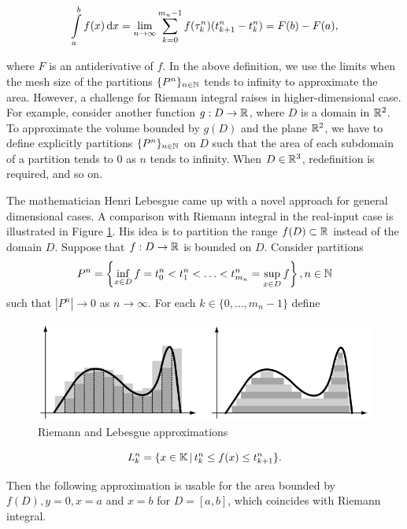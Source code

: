 \begin{equation}
  \label{equation:definition:riemann-integral}
  \int\limits_a^b f(x)\,\mathrm{d}  x = \lim\limits_{n\to\infty}\sum\limits_{k=0}^{m_n-1}f(\tau_k^n)(t_{k+1}^n-t_k^n) = F(b)-F(a),
\end{equation}

where $F$ is an antiderivative of $f$. In the above definition, we use the limits when the mesh size of the partitions $\{P^n\}_{n\in\mathbb{N}}$ tends to infinity to approximate the area. However, a challenge for Riemann integral raises in higher-dimensional case. For example, consider another function $g: D\to\mathbb{R}$, where $D$ is a domain in $\mathbb{R}^2$. To approximate the volume bounded by $g(D)$ and the plane $\mathbb{R}^2$, we have to define explicitly partitions $\{P^n\}_{n\in\mathbb{N}}$ on $D$ such that the area of each subdomain of a partition tends to $0$ as $n$ tends to infinity. When $D\in\mathbb{R}^3$, redefinition is required, and so on.

The mathematician Henri Lebesgue came up with a novel approach for general dimensional cases. A comparison with Riemann integral in the real-input case is illustrated in Figure \ref{figure:schilling}. His idea is to partition the range $f(D)\subset\mathbb{R}$ instead of the domain $D$. Suppose that $f:D\to\mathbb{R}$ is bounded on $D$. Consider partitions $$P^n=\left\{\inf\limits_{x\in D} f=t^n_0<t^n_1<\ldots<t^n_{m_n}=\sup\limits_{x\in D} f\right\}, n\in\mathbb{N}$$ such that $|P^n|\to 0$ as $n\to\infty$. For each $k\in\{0,\ldots,m_n-1\}$ define

\begin{figure}
  \centering
  \includegraphics[width=0.75\linewidth]{img/riemann-vs-lebesgue.png}
  \vspace{0.5cm}
  \caption[Riemann and Lebesgue approximations]{Riemann and Lebesgue approximations \cite{schilling2017measures}}
  \label{figure:schilling}
\end{figure}

$$L_k^n=\{x\in\mathbb{K} \,|\, t_k^n\le f(x)\le t_{k+1}^n\}.$$

Then the following approximation is usable for the area bounded by $f(D), y=0, x=a$ and $x=b$ for $D=[a,b]$, which coincides with Riemann integral.

